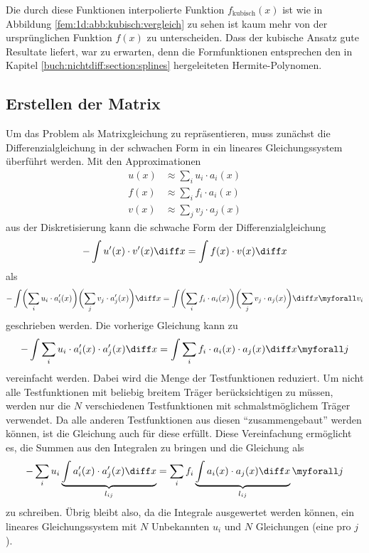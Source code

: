 Die durch diese Funktionen interpolierte Funktion $f_\text{kubisch} (x)$ ist wie in Abbildung \ref{fem:1d:abb:kubisch:vergleich} zu sehen ist kaum mehr von der ursprünglichen Funktion $f(x)$ zu unterscheiden.
Dass der kubische Ansatz gute Resultate liefert, war zu erwarten, denn die Formfunktionen entsprechen den in Kapitel \ref{buch:nichtdiff:section:splines} hergeleiteten Hermite-Polynomen.


\subsection{Erstellen der Matrix\label{fem:1d:matrix_erstellen}}
Um das Problem als Matrixgleichung zu repräsentieren, muss zunächst die Differenzialgleichung in der schwachen Form in ein lineares Gleichungssystem überführt werden.
Mit den Approximationen 
\begin{align}
    u(x) &\approx \sum_i u_i \cdot a_i(x) \\
    f(x) &\approx \sum_i f_i \cdot a_i(x) \\
    v(x) &\approx \sum_j v_j \cdot a_j(x)
\end{align}
aus der Diskretisierung kann die schwache Form der Differenzialgleichung 
\begin{equation}
    - \int u'(x) \cdot v'(x) \diff x = \int f(x) \cdot v(x) \diff x
\end{equation}
als
\begin{equation}
    - \int \biggl(\sum_i u_i \cdot a'_i(x)\biggr) \biggl(\sum_j v_j \cdot a'_j(x)\biggr) \diff x 
    = \int \biggl(\sum_i f_i \cdot a_i(x) \biggr) \biggl(\sum_j v_j \cdot a_j(x) \biggr) \diff x 
    \myforall v_i
\end{equation}
geschrieben werden.
Die vorherige Gleichung kann zu
\begin{equation}
    - \int \sum_i u_i \cdot a'_i(x) \cdot a'_j(x) \diff x = \int \sum_i f_i \cdot a_i(x) \cdot a_j(x) \diff x \myforall j
\end{equation}
vereinfacht werden.
Dabei wird die Menge der Testfunktionen reduziert.
Um nicht alle Testfunktionen mit beliebig breitem Träger berücksichtigen zu müssen, werden nur die $N$ verschiedenen Testfunktionen mit schmalstmöglichem Träger verwendet.
Da alle anderen Testfunktionen aus diesen ``zusammengebaut'' werden können, ist die Gleichung auch für diese erfüllt.
Diese Vereinfachung ermöglicht es, die Summen aus den Integralen zu bringen und die Gleichung als
\begin{equation}
    - \sum_i u_i \underbrace{\int a'_i(x) \cdot a'_j(x) \diff x}_{l_{ij}} = \sum_i f_i \underbrace{\int a_i(x) \cdot a_j(x) \diff x}_{l_{ij}} \myforall j \label{papers:fem:prinzip1d:finale_gleichung}
\end{equation}
zu schreiben.
Übrig bleibt also, da die Integrale ausgewertet werden können, ein lineares Gleichungssystem mit $N$ Unbekannten $u_i$ und $N$ Gleichungen (eine pro $j$). 

